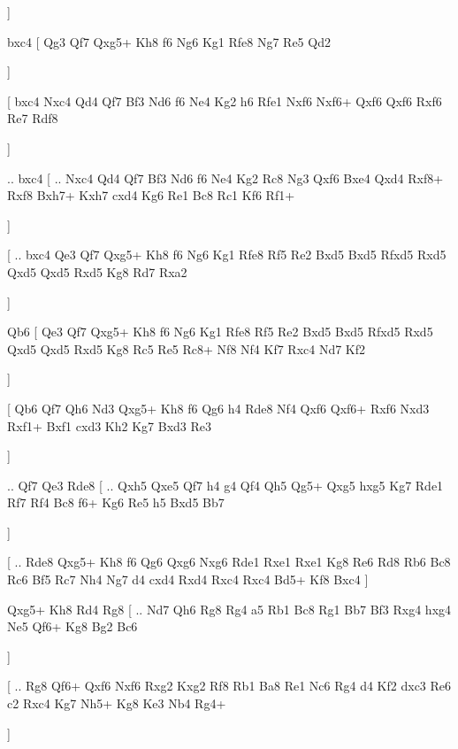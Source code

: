        \dummy  \showboard  ]  
       
       bxc4 [  Qg3 Qf7  Qxg5+ Kh8  f6 Ng6  Kg1 Rfe8  Ng7 Re5  Qd2   
       
       \dummy  \showboard  ]  
       
       [  bxc4 Nxc4  Qd4 Qf7  Bf3 Nd6  f6 Ne4  Kg2 h6  Rfe1 Nxf6  Nxf6+ Qxf6  Qxf6 Rxf6  Re7 Rdf8  
       
        \dummy  \showboard  ] 
        
        .. bxc4 [ .. Nxc4  Qd4 Qf7  Bf3 Nd6  f6 Ne4  Kg2 Rc8  Ng3 Qxf6  Bxe4 Qxd4  Rxf8+ Rxf8  Bxh7+ Kxh7  cxd4 Kg6  Re1 Bc8  Rc1 Kf6  Rf1+   
        
        \dummy  \showboard  ]  
        
        [ .. bxc4  Qe3 Qf7  Qxg5+ Kh8  f6 Ng6  Kg1 Rfe8  Rf5 Re2  Bxd5 Bxd5  Rfxd5 Rxd5  Qxd5 Qxd5  Rxd5 Kg8  Rd7 Rxa2  
        
         \dummy  \showboard  ]
         
           Qb6 [  Qe3 Qf7  Qxg5+ Kh8  f6 Ng6  Kg1 Rfe8  Rf5 Re2  Bxd5 Bxd5  Rfxd5 Rxd5  Qxd5 Qxd5  Rxd5 Kg8  Rc5 Re5  Rc8+ Nf8  Nf4 Kf7  Rxc4 Nd7  Kf2  
           
            \dummy  \showboard  ]  
            
            [  Qb6 Qf7  Qh6 Nd3  Qxg5+ Kh8  f6 Qg6  h4 Rde8  Nf4 Qxf6  Qxf6+ Rxf6  Nxd3 Rxf1+  Bxf1 cxd3  Kh2 Kg7  Bxd3 Re3   
            
            \dummy  \showboard  ] 
            
            .. Qf7    Qe3   Rde8 [ .. Qxh5  Qxe5 Qf7  h4 g4  Qf4 Qh5  Qg5+ Qxg5  hxg5 Kg7  Rde1 Rf7  Rf4 Bc8  f6+ Kg6  Re5 h5  Bxd5 Bb7   
            
            \dummy  \showboard  ]  
            
            [ .. Rde8  Qxg5+ Kh8  f6 Qg6  Qxg6 Nxg6  Rde1 Rxe1  Rxe1 Kg8  Re6 Rd8  Rb6 Bc8  Rc6 Bf5  Rc7 Nh4  Ng7 d4  cxd4 Rxd4  Rxc4 Rxc4  Bd5+ Kf8  Bxc4   \dummy  \showboard  ]  
            
            Qxg5+   Kh8    Rd4   Rg8 [ .. Nd7  Qh6 Rg8  Rg4 a5  Rb1 Bc8  Rg1 Bb7  Bf3 Rxg4  hxg4 Ne5  Qf6+ Kg8  Bg2 Bc6  
            
             \dummy  \showboard  ] 
            
             [ .. Rg8  Qf6+ Qxf6  Nxf6 Rxg2  Kxg2 Rf8  Rb1 Ba8  Re1 Nc6  Rg4 d4  Kf2 dxc3  Re6 c2  Rxc4 Kg7  Nh5+ Kg8  Ke3 Nb4  Rg4+   
             
             \dummy  \showboard  ] 
             
